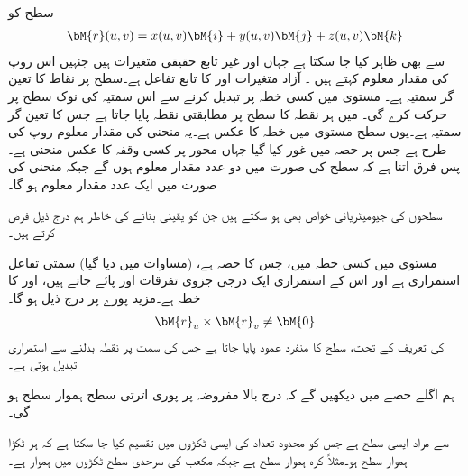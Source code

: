سطح  کو 
\begin{align}\label{مساوات_خطی_تکمل_سطح_مقدار_معلوم_روپ}
\bM{r}(u,v)=x(u,v)\bM{i}+y(u,v)\bM{j}+z(u,v)\bM{k}
\end{align}
سے بھی ظاہر کیا جا سکتا ہے جہاں  اور  غیر تابع حقیقی متغیرات ہیں جنہیں اس روپ کی مقدار معلوم کہتے ہیں ۔  آزاد متغیرات  اور  کا تابع تفاعل  ہے۔سطح  پر نقاط کا تعین گر سمتیہ  ہے۔ مستوی  میں کسی خطہ  پر  تبدیل کرنے سے اس سمتیہ کی نوک سطح  پر حرکت کرے گی۔  میں ہر نقطہ  کا سطح  پر مطابقتی نقطہ پایا جاتا ہے جس کا تعین گر سمتیہ  ہے۔یوں سطح  مستوی  میں خطہ  کا عکس ہے۔یہ منحنی  کی مقدار معلوم روپ  کی طرح ہے جس پر حصہ  میں غور کیا گیا جہاں  محور  پر کسی وقفہ کا عکس منحنی  ہے۔ پس فرق اتنا ہے کہ سطح کی صورت میں دو عدد مقدار معلوم ہوں گے جبکہ منحنی کی صورت میں ایک عدد مقدار معلوم ہو گا۔

سطحوں کی  جیومیٹریائی خواص بھی ہو سکتے ہیں جن کو یقینی بنانے کی خاطر ہم درج ذیل فرض کرتے ہیں۔

مستوی  میں کسی خطہ میں، جس کا  حصہ ہے، (مساوات  میں دیا گیا)  سمتی تفاعل  استمراری ہے اور  اس کے استمراری ایک درجی جزوی تفرقات  اور  پائے جاتے ہیں، اور   کا  خطہ ہے۔مزید پورے  پر درج ذیل ہو گا۔
\begin{align}\label{مساوات_خطی_تکمل_مفروضہ_ہموار_سطح}
\bM{r}_u\times \bM{r}_v\ne \bM{0}
\end{align}
  کی تعریف کے تحت، سطح کا منفرد عمود پایا جاتا ہے جس کی سمت  پر نقطہ بدلنے سے استمراری تبدیل ہوتی ہے۔  

ہم اگلے حصے میں دیکھیں گے کہ درج بالا مفروضہ پر پوری اترتی سطح  ہموار سطح ہو گی۔

 سے مراد ایسی سطح ہے جس کو محدود تعداد کی ایسی ٹکڑوں میں تقسیم کیا جا سکتا ہے کہ ہر ٹکڑا ہموار سطح ہو۔مثلاً کرہ ہموار سطح ہے جبکہ مکعب کی سرحدی سطح ٹکڑوں میں ہموار ہے۔

